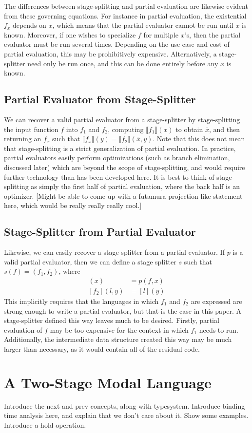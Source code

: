 The differences between stage-splitting and partial evaluation are likewise evident from these governing equations.  For instance in partial evaluation, the existential $f_x$ depends on $x$, which means that the partial evaluator cannot be run until $x$ is known.  Moreover, if one wishes to specialize $f$ for multiple $x$'s, then the partial evaluator must be run several times.  Depending on the use case and cost of partial evaluation, this may be prohibitively expensive.  Alternatively, a stage-splitter need only be run once, and this can be done entirely before any $x$ is known.

\subsection{Partial Evaluator from Stage-Splitter}

We can recover a valid partial evaluator from a stage-splitter by stage-splitting the input function $f$ into $f_1$ and $f_2$, computing $\llbracket f_1 \rrbracket(x)$ to obtain $\bar x$, and then returning an $f_x$ such that $\llbracket f_x \rrbracket(y) = \llbracket f_2 \rrbracket(\bar x, y)$.  Note that this does not mean that stage-splitting is a strict generalization of partial evaluation.  In practice, partial evaluators easily perform optimizations (such as branch elimination, discussed later) which are beyond the scope of stage-splitting, and would require further technology than has been developed here.  It is best to think of stage-splitting as simply the first half of partial evaluation, where the back half is an optimizer. [Might be able to come up with a futamura projection-like statement here, which would be really really really cool.]

\subsection{Stage-Splitter from Partial Evaluator}

Likewise, we can easily recover a stage-splitter from a partial evaluator.  If $p$ is a valid partial evaluator, then we can define a stage splitter $s$ such that $s(f)=(f_1,f_2)$, where
\begin{align*}
[f_1](x) &= p (f,x) \\
[f_2](l,y) &= [l] (y)
\end{align*}
This implicitly requires that the languages in which $f_1$ and $f_2$ are expressed are strong enough to write a partial evaluator, but that is the case in this paper.  A stage-splitter defined this way leaves much to be desired.  Firstly, partial evaluation of $f$ may be too expensive for the context in which $f_1$ needs to run.  Additionally, the intermediate data structure created this way may be much larger than necessary, as it would contain all of the residual code.

\section{A Two-Stage Modal Language}

Introduce the next and prev concepts, along with typesystem.  Introduce binding time analysis here, and explain that we don't care about it.  Show some examples.  Introduce a hold operation.
